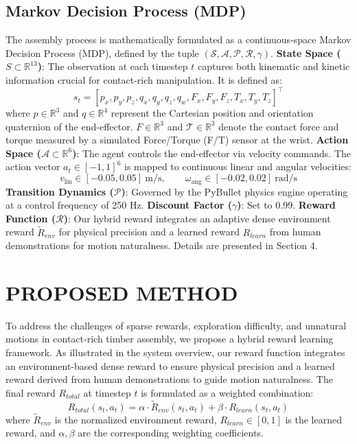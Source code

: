 \documentclass[conference]{IEEEtran}
\begin{document}
\subsection{Markov Decision Process (MDP)}
The assembly process is mathematically formulated as a continuous-space Markov Decision Process (MDP), defined by the tuple $(\mathcal{S}, \mathcal{A}, \mathcal{P}, \mathcal{R}, \gamma)$.
\textbf{State Space ($S \subset \mathbb{R}^{13}$)}: The observation at each timestep $t$ captures both kinematic and kinetic information crucial for contact-rich manipulation. It is defined as:
$$s_t = [p_x, p_y, p_z, q_x, q_y, q_z, q_w, F_x, F_y, F_z, T_x, T_y, T_z]^\top$$
where $p \in \mathbb{R}^3$ and $q \in \mathbb{R}^4$ represent the Cartesian position and orientation quaternion of the end-effector. $F \in \mathbb{R}^3$ and $\mathcal{T} \in \mathbb{R}^3$ denote the contact force and torque measured by a simulated Force/Torque (F/T) sensor at the wrist.
\textbf{Action Space ($\mathcal{A} \subset \mathbb{R}^6$)}: The agent controls the end-effector via velocity commands. The action vector $a_t \in [-1, 1]^6$ is mapped to continuous linear and angular velocities:
$$v_{\text{lin}} \in [-0.05, 0.05]~\text{m/s}, \qquad \omega_{\text{ang}} \in [-0.02, 0.02]~\text{rad/s}$$
\textbf{Transition Dynamics ($\mathcal{P}$)}: Governed by the PyBullet physics engine operating at a control frequency of 250 Hz.
\textbf{Discount Factor ($\gamma$)}: Set to 0.99.
\textbf{Reward Function ($\mathcal{R}$)}: Our hybrid reward integrates an adaptive dense environment reward $\tilde{R}_{env}$ for physical precision and a learned reward $R_{learn}$ from human demonstrations for motion naturalness. Details are presented in Section 4.

\section{PROPOSED METHOD}
To address the challenges of sparse rewards, exploration difficulty, and unnatural motions in contact-rich timber assembly, we propose a hybrid reward learning framework. As illustrated in the system overview, our reward function integrates an environment-based dense reward to ensure physical precision and a learned reward derived from human demonstrations to guide motion naturalness. The final reward $R_{total}$ at timestep $t$ is formulated as a weighted combination:
$$R_{total}(s_t, a_t) = \alpha \cdot \tilde{R}_{env}(s_t, a_t) + \beta \cdot R_{learn}(s_t, a_t)$$
where $\tilde{R}_{env}$ is the normalized environment reward, $R_{learn} \in [0, 1]$ is the learned reward, and $\alpha, \beta$ are the corresponding weighting coefficients.
\end{document}
